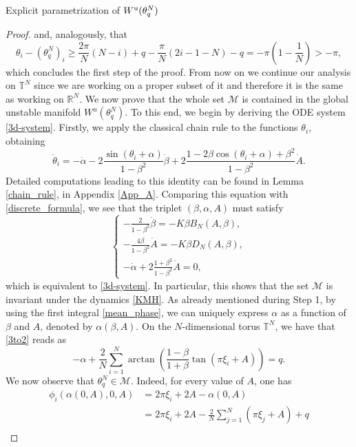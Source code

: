 \documentclass{article}
\theoremstyle{definition}
\newcommand{\jump}{\hfill\break}
\newcommand{\R}{\mathbb{R}}
\newcommand{\T}{\mathbb{T}}
\renewcommand{\u}{\textnormal{u}}
\begin{document}
\begin{section}{Explicit parametrization of $W^\u(\theta^N_q)$}
\begin{proof}
and, analogously, that
$$\theta_i-\left(\theta^N_q\right)_i\geq\frac{2\pi}{N}(N-i)+q-\frac{\pi}{N}(2i-1-N)-q=-\pi\left(1-\frac{1}{N}\right)>-\pi,$$
which concludes the first step of the proof. From now on we continue our analysis on $\T^N$ since we are working on a proper subset of it and therefore it is the same as working on $\R^N$.\jump\jump\noindent
 \fbox{\textbf{Step 2:} $\mathcal{M}\subseteq W^\u(\theta^N_q)$} We now prove that the whole set $\mathcal{M}$ is contained in the global unstable manifold $W^u(\theta^N_q)$. To this end, we begin by deriving the ODE system \eqref{3d-system}. Firstly, we apply the classical chain rule to the functions $\theta_i$, obtaining
$$\dot{\theta}_i=-\dot{\alpha}-2\frac{\sin(\theta_i+\alpha)}{1-\beta^2}\dot{\beta}+2\frac{1-2\beta\cos(\theta_i+\alpha)+\beta^2}{1-\beta^2}\dot{A}.$$
Detailed computations leading to this identity can be found in Lemma \ref{chain_rule}, in Appendix \ref{App_A}. Comparing this equation with \eqref{discrete_formula}, we see that the triplet $(\beta,\alpha,A)$ must satisfy
    \begin{equation}
    \begin{cases}
    \displaystyle
        -\frac{2}{1-\beta^2}\dot{\beta}=-K\beta B_{N}(A,\beta),\\
        \displaystyle
        -\frac{4\beta}{1-\beta^2}\dot{A}=-K\beta D_{N}(A,\beta),\\
        \displaystyle
        -\dot{\alpha}+2\frac{1+\beta^2}{1-\beta^2}\dot{A}=0,
    \end{cases}
    \end{equation}
which is equivalent to \eqref{3d-system}. In particular, this shows that the set $\mathcal{M}$ is invariant under the dynamics \eqref{KMH}. As already mentioned during Step 1, by using the first integral \eqref{mean_phase}, we can uniquely express $\alpha$ as a function of $\beta$ and $A$, denoted by $\alpha(\beta,A)$. On the $N$-dimensional torus $\T^N$, we have that \eqref{3to2} reads as
\begin{equation}\label{mean_phase_new}
    -\alpha+\frac{2}{N}\sum_{i=1}^N\arctan\left(\frac{1-\beta}{1+\beta}\tan\left(\pi\xi_i+A\right)\right)=q.
\end{equation}
We now observe that $\theta^N_q\in\mathcal{M}$. Indeed, for every value of $A$, one has
\begin{align*}
        \phi_i(\alpha(0,A),0,A)
        &=2\pi\xi_i+2A-\alpha(0,A)\\
        &=2\pi\xi_i+2A-\frac{2}{N}\sum_{j=1}^N(\pi\xi_j+A)+q\\

\end{align*}
\end{proof}
\end{section}
\end{document}
